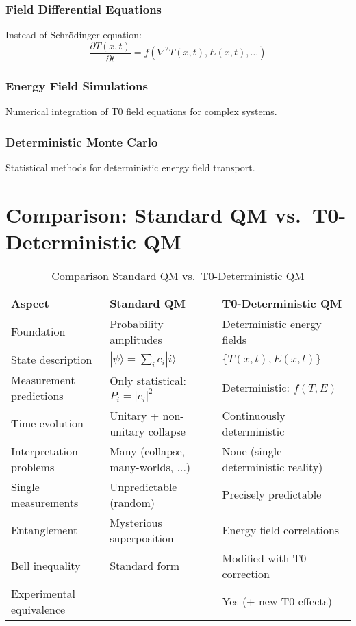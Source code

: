 \documentclass[12pt,a4paper]{article}
\newcommand{\Tfield}{T(x,t)}
\newcommand{\Efield}{E(x,t)}
\begin{document}
	\subsubsection{Field Differential Equations}
	
	Instead of Schrödinger equation:
	\begin{equation}
		\frac{\partial \Tfield}{\partial t} = f(\nabla^2 \Tfield, \Efield, \ldots)
	\end{equation}
	
	\subsubsection{Energy Field Simulations}
	
	Numerical integration of T0 field equations for complex systems.
	
	\subsubsection{Deterministic Monte Carlo}
	
	Statistical methods for deterministic energy field transport.
	
	\section{Comparison: Standard QM vs.~T0-Deterministic QM}
	
	\begin{table}[htbp]
		\centering
		\small
		\begin{tabular}{|p{4.5cm}|p{5.5cm}|p{6cm}|}
			\hline
			\textbf{Aspect} & \textbf{Standard QM} & \textbf{T0-Deterministic QM} \\
			\hline
			Foundation & Probability amplitudes & Deterministic energy fields \\
			\hline
			State description & $|\psi\rangle = \sum_i c_i |i\rangle$ & $\{T(x,t), E(x,t)\}$ \\
			\hline
			Measurement predictions & Only statistical: $P_i = |c_i|^2$ & Deterministic: $f(T, E)$ \\
			\hline
			Time evolution & Unitary + non-unitary collapse & Continuously deterministic \\
			\hline
			Interpretation problems & Many (collapse, many-worlds, ...) & None (single deterministic reality) \\
			\hline
			Single measurements & Unpredictable (random) & Precisely predictable \\
			\hline
			Entanglement & Mysterious superposition & Energy field correlations \\
			\hline
			Bell inequality & Standard form & Modified with T0 correction \\
			\hline
			Experimental equivalence & - & Yes (+ new T0 effects) \\
			\hline
		\end{tabular}
		\caption{Comparison Standard QM vs.~T0-Deterministic QM}
	\end{table}
	
\end{document}
